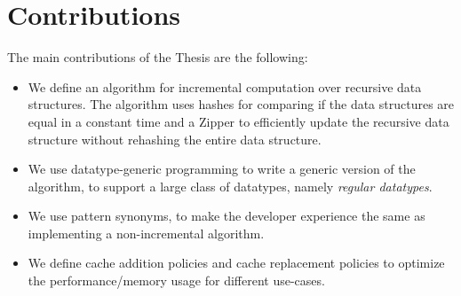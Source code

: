 \section{Contributions}

The main contributions of the Thesis are the following:

\begin{itemize}
    \item We define an algorithm for incremental computation over recursive data structures. The algorithm uses hashes for comparing if the data structures are equal in a constant time and a Zipper to efficiently update the recursive data structure without rehashing the entire data structure.
    \item We use datatype-generic programming to write a generic version of the algorithm, to support a large class of datatypes, namely \textit{regular datatypes}.
    \item We use pattern synonyms, to make the developer experience the same as implementing a non-incremental algorithm.
    \item We define cache addition policies and cache replacement policies to optimize the performance/memory usage for different use-cases.
\end{itemize}
